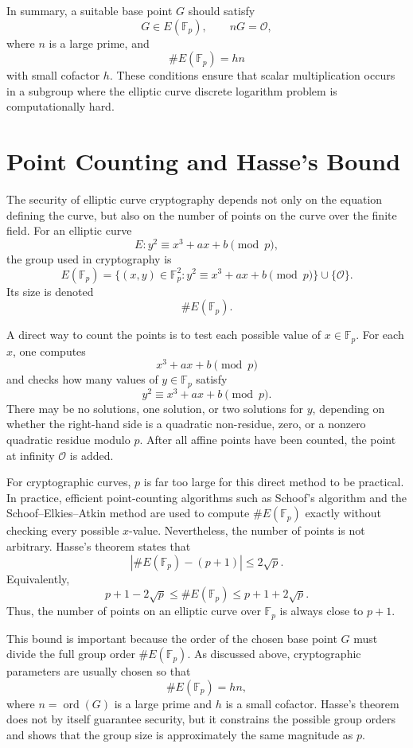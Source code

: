 \documentclass[12pt,a4paper]{article}
\begin{document}
In summary, a suitable base point \(G\) should satisfy
\[G\in E(\mathbb{F}_p), \qquad nG=\mathcal{O},\]
where \(n\) is a large prime, and
\[\#E(\mathbb{F}_p)=hn\]
with small cofactor \(h\). These conditions ensure that scalar multiplication occurs in a subgroup where the elliptic curve discrete logarithm problem is computationally hard.

\section{Point Counting and Hasse's Bound}

The security of elliptic curve cryptography depends not only on the equation defining the curve, but also on the number of points on the curve over the finite field. For an elliptic curve
\[E: y^2 \equiv x^3 + ax + b \pmod p,\]
the group used in cryptography is
\[E(\mathbb{F}_p)=\{(x,y)\in\mathbb{F}_p^2 : y^2 \equiv x^3+ax+b \pmod p\}\cup\{\mathcal{O}\}.\]
Its size is denoted
\[\#E(\mathbb{F}_p).\]

A direct way to count the points is to test each possible value of \(x\in\mathbb{F}_p\). For each \(x\), one computes
\[x^3+ax+b \pmod p\]
and checks how many values of \(y\in\mathbb{F}_p\) satisfy
\[y^2\equiv x^3+ax+b \pmod p.\]
There may be no solutions, one solution, or two solutions for \(y\), depending on whether the right-hand side is a quadratic non-residue, zero, or a nonzero quadratic residue modulo \(p\). After all affine points have been counted, the point at infinity \(\mathcal{O}\) is added.

For cryptographic curves, \(p\) is far too large for this direct method to be practical. In practice, efficient point-counting algorithms such as Schoof's algorithm and the Schoof--Elkies--Atkin method are used to compute \(\#E(\mathbb{F}_p)\) exactly without checking every possible \(x\)-value\cite{washington2008,schoof1985}. Nevertheless, the number of points is not arbitrary. Hasse's theorem states that
\[\left|\#E(\mathbb{F}_p)-(p+1)\right|\leq 2\sqrt p.\]
Equivalently,
\[p+1-2\sqrt p\leq\#E(\mathbb{F}_p)\leq p+1+2\sqrt p.\]
Thus, the number of points on an elliptic curve over \(\mathbb{F}_p\) is always close to \(p+1\).

This bound is important because the order of the chosen base point \(G\) must divide the full group order \(\#E(\mathbb{F}_p)\). As discussed above, cryptographic parameters are usually chosen so that
\[
\#E(\mathbb{F}_p)=hn,
\]
where \(n=\operatorname{ord}(G)\) is a large prime and \(h\) is a small cofactor. Hasse's theorem does not by itself guarantee security, but it constrains the possible group orders and shows that the group size is approximately the same magnitude as \(p\).
\end{document}
